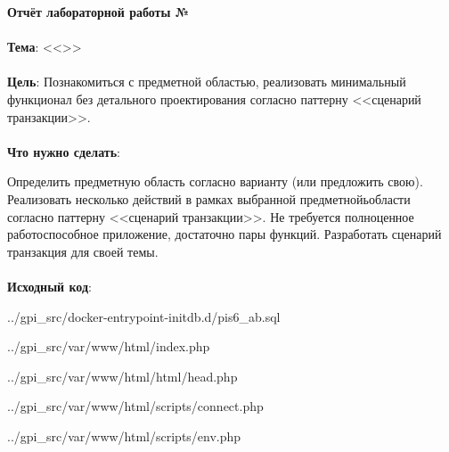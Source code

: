 \documentclass[12pt, a4paper, simple]{eskdtext}
\def \gpiDocTopic {Отчёт лабораторной работы №\gpiDocNum}
\begin{document}
    
    \begin{center}
        \textbf{\gpiDocTopic}
    \end{center}

    \paragraph{} \textbf{Тема}: <<\gpiTopicRep>>

    \paragraph{} \textbf{Цель}: Познакомиться с предметной областью,
    реализовать минимальный функционал без детального проектирования согласно паттерну <<сценарий транзакции>>.

    \paragraph{} \textbf{Что нужно сделать}:

    Определить предметную область согласно варианту (или предложить свою).
    Реализовать несколько действий в рамках выбранной предметнойьобласти согласно паттерну <<сценарий транзакции>>.
    Не требуется полноценное работоспособное приложение, достаточно пары функций.
    Разработать сценарий транзакция для своей темы.

    \paragraph{} \textbf{Исходный код}: 



    
        {../gpi_src/docker-entrypoint-initdb.d/pis6_ab.sql}

    
        {../gpi_src/var/www/html/index.php}

    
        {../gpi_src/var/www/html/html/head.php}

    
        {../gpi_src/var/www/html/scripts/connect.php}
        
    
            {../gpi_src/var/www/html/scripts/env.php}
        
\end{document}
